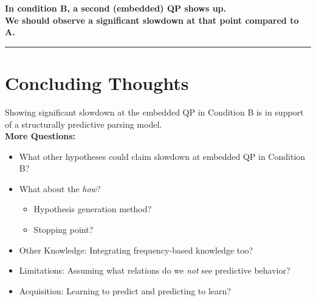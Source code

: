 \documentclass[12pt]{article}
\def\blank{\medskip\hrule\medskip}
\begin{document}

\begin{center}
\textbf{In condition B, a second (embedded) QP shows up. \\ We should observe a significant slowdown at that point compared to A.}
\end{center}


\blank

\section{Concluding Thoughts}
Showing significant slowdown at the embedded QP in Condition B is in support of a structurally predictive parsing
model. \\

\textbf{More Questions:}
\begin{itemize}
    \item What other hypotheses could claim slowdown at embedded QP in Condition B?
    \item What about the \textit{how}?
        \begin{itemize}
            \item Hypothesis generation method?
            \item Stopping point?
        \end{itemize}
    \item Other Knowledge: Integrating frequency-based knowledge too?
    \item Limitations: Assuming what relations do we \textit{not} see predictive behavior?
    \item Acquisition: Learning to predict and predicting to learn?
\end{itemize}
\end{document}
